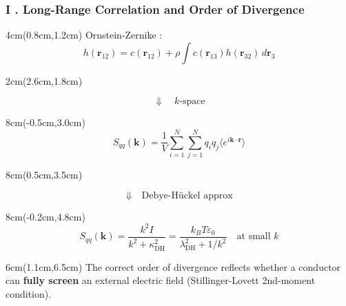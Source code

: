 \documentclass{beamer}
\begin{document}
	\begin{frame}
		\frametitle{I .  Long-Range Correlation and Order of Divergence}
		\footnotesize 
		\begin{textblock*}{4cm}(0.8cm,1.2cm) 			
			Ornstein-Zernike : 
			\begin{equation*}
				h(\mathbf{r}_{12}) = c(\mathbf{r}_{12}) + \rho \int c(\mathbf{r}_{13}) h(\mathbf{r}_{32}) \, d \mathbf{r}_3 
			\end{equation*}
		\end{textblock*}
		
		\begin{textblock*}{2cm}(2.6cm,1.8cm)  
			\begin{center}
				\begin{equation*}
					\Downarrow \quad 
					\text{$k$-space}
				\end{equation*}
			\end{center}
		\end{textblock*}
		
		\begin{textblock*}{8cm}(-0.5cm,3.0cm)  
			\begin{equation*}
				S_{qq}(\mathbf{k}) = \dfrac{1}{V} \sum_{i=1}^N \sum_{j=1}^N q_i q_j \langle e^{i\mathbf{k}\cdot \mathbf{r}} \rangle  
			\end{equation*}
		\end{textblock*}
		
		\begin{textblock*}{8cm}(0.5cm,3.5cm)  
			\begin{center}
				\begin{equation*}
					\Downarrow \quad \text{Debye-Hückel approx}
				\end{equation*}
			\end{center}
		\end{textblock*}
		
		\begin{textblock*}{8cm}(-0.2cm,4.8cm)  
			\begin{equation*}
				S_{qq}(\mathbf{k}) =\dfrac{k^2I }{k^2 + \kappa_{\text{DH}}^2} 
				=  \dfrac{k_B T \varepsilon_0 }{\lambda_{\text{DH}}^2+ 1/k^2}  \quad \text{at small $k$}
			\end{equation*}
		\end{textblock*}		
		
		\begin{textblock*}{6cm}(1.1cm,6.5cm)  
			The correct order of divergence reflects whether a conductor can \textbf{fully screen} an external electric field (Stillinger-Lovett 2nd-moment condition\footnotemark[8]).
		\end{textblock*}
		

\end{frame}
\end{document}
